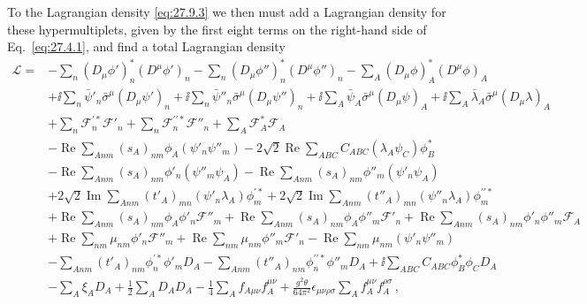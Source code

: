 To the Lagrangian density \eqref{eq:27.9.3} we then must add a Lagrangian
density for these hypermultiplets, given by the first eight terms on the
right-hand side of Eq.~\eqref{eq:27.4.1}, and find a total Lagrangian density
\begin{equation}
  \begin{aligned}
  \mathcal{L}={}&
  -\sum_n(D_\mu\phi')_n^*(D^\mu\phi')_n
  -\sum_n(D_\mu\phi'')_n^*(D^\mu\phi'')_n
  -\sum_A(D_\mu\phi)_A^*(D^\mu\phi)_A
  \\
  &+\ii\sum_n\bar\psi'_n\bar\sigma^\mu(D_\mu\psi')_n
  +\ii\sum_n\bar\psi''_n\bar\sigma^\mu(D_\mu\psi'')_n
  +\ii\sum_A\bar\psi_A\bar\sigma^\mu(D_\mu\psi)_A
  +\ii\sum_A\bar\lambda_A\bar\sigma^\mu(D_\mu\lambda)_A
  \\
  &+\sum_n\mathcal{F}_n^{\prime *}\mathcal{F}'_n
  +\sum_n\mathcal{F}_n^{\prime\prime *}\mathcal{F}''_n
  +\sum_A\mathcal{F}_A^*\mathcal{F}_A
  \\
  &-\operatorname{Re}\sum_{Anm}(s_A)_{nm}\phi_A
    \left(\psi'_n\psi''_m\right)
  -2\sqrt{2}\operatorname{Re}\sum_{ABC}C_{ABC}
    \left(\lambda_A\psi_C\right)\phi_B^*
  \\
  &-\operatorname{Re}\sum_{Anm}(s_A)_{nm}\phi'_n
    \left(\psi''_m\psi_A\right)
  -\operatorname{Re}\sum_{Anm}(s_A)_{nm}\phi''_m
    \left(\psi'_n\psi_A\right)
  \\
  &+2\sqrt{2}\operatorname{Im}\sum_{Anm}(t'_A)_{mn}
    \left(\psi'_n\lambda_A\right)\phi_m^{\prime *}
  +2\sqrt{2}\operatorname{Im}\sum_{Anm}(t''_A)_{mn}
    \left(\psi''_n\lambda_A\right)
    \phi_m^{\prime\prime *}
  \\
  &+\operatorname{Re}\sum_{Anm}(s_A)_{nm}\phi_A\phi'_n\mathcal{F}''_m
  +\operatorname{Re}\sum_{Anm}(s_A)_{nm}\phi_A\phi''_m\mathcal{F}'_n
  +\operatorname{Re}\sum_{Anm}(s_A)_{nm}\phi'_n\phi''_m\mathcal{F}_A
  \\
  &+\operatorname{Re}\sum_{nm}\mu_{nm}\phi'_n\mathcal{F}''_m
  +\operatorname{Re}\sum_{nm}\mu_{nm}\phi''_m\mathcal{F}'_n
  -\operatorname{Re}\sum_{nm}\mu_{nm}
    \left(\psi'_n\psi''_m\right)
  \\
  &-\sum_{Anm}(t'_A)_{nm}\phi_n^{\prime *}\phi'_mD_A
  -\sum_{Anm}(t''_A)_{nm}\phi_n^{\prime\prime *}\phi''_mD_A
  +\ii\sum_{ABC}C_{ABC}\phi_B^*\phi_CD_A
  \\
  &-\sum_A\xi_AD_A+\frac12\sum_AD_AD_A
  -\frac14\sum_Af_{A\mu\nu}f_A^{\mu\nu}
  +\frac{g^2\theta}{64\pi^2}\epsilon_{\mu\nu\rho\sigma}
    \sum_Af_A^{\mu\nu}f_A^{\rho\sigma}\,,
  \end{aligned}
  \tag{27.9.30}\label{eq:27.9.30}
\end{equation}
